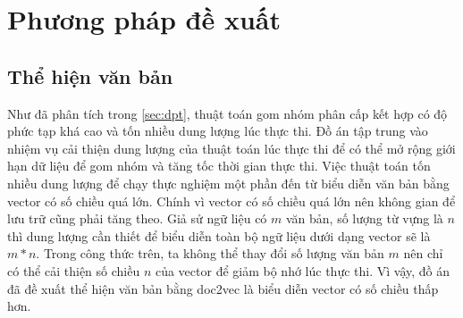 \chapter{Phương pháp đề xuất}
\label{Chapter3}

%

\section{Thể hiện văn bản}
\label{sec:thvb}
Như đã phân tích trong \ref{sec:dpt}, thuật toán gom nhóm phân cấp kết hợp có độ phức tạp khá cao và tốn nhiều dung lượng lúc thực thi.
Đồ án tập trung vào nhiệm vụ cải thiện dung lượng của thuật toán lúc thực thi để có thể mở rộng giới hạn dữ liệu để gom nhóm và tăng tốc thời gian thực thi.
Việc thuật toán tốn nhiều dung lượng để chạy thực nghiệm một phần đến từ biểu diễn văn bản bằng vector có số chiều quá lớn.
Chính vì vector có số chiều quá lớn nên không gian để lưu trữ cũng phải tăng theo.
Giả sử ngữ liệu có $m$ văn bản, số lượng từ vựng là $n$ thì dung lượng cần thiết để biểu diễn toàn bộ ngữ liệu dưới dạng vector sẽ là $m * n$.
Trong công thức trên, ta không thể thay đổi số lượng văn bản $m$ nên chỉ có thể cải thiện số chiều $n$ của vector để giảm bộ nhớ lúc thực thi.
Vì vậy, đồ án đã đề xuất thể hiện văn bản bằng doc2vec là biểu diễn vector có số chiều thấp hơn.

